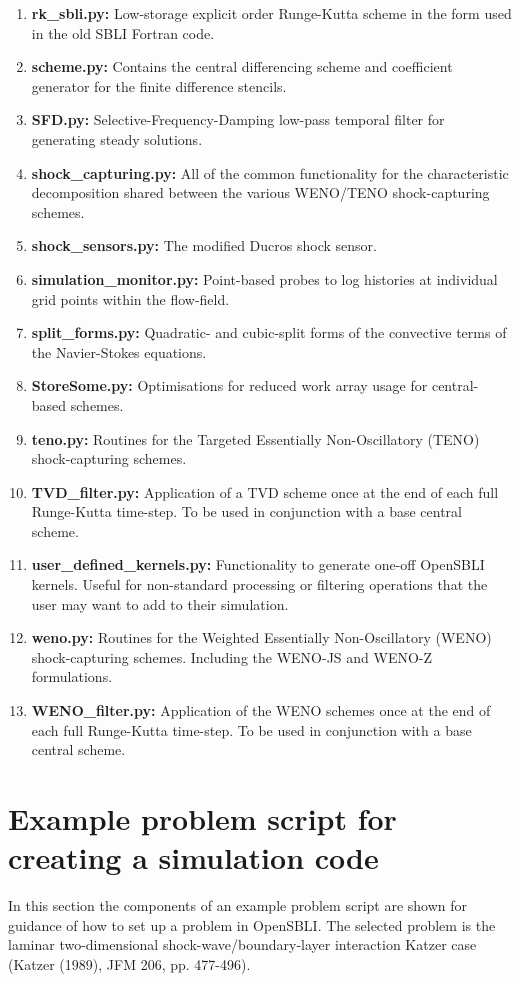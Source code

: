 \documentclass[11pt]{article}
\begin{document}
\begin{enumerate}
	\item{\textbf{rk\_sbli.py:} Low-storage explicit  order Runge-Kutta scheme in the form used in the old SBLI Fortran code.}	
	\item{\textbf{scheme.py:} Contains the central differencing scheme and coefficient generator for the finite difference stencils.}
  \item{\textbf{SFD.py:} Selective-Frequency-Damping low-pass temporal filter for generating steady solutions.}
	\item{\textbf{shock\_capturing.py:} All of the common functionality for the characteristic decomposition shared between the various WENO/TENO shock-capturing schemes.}
	\item{\textbf{shock\_sensors.py:} The modified Ducros shock sensor.}
  \item{\textbf{simulation\_monitor.py:} Point-based probes to log histories at individual grid points within the flow-field.}
  \item{\textbf{split\_forms.py:} Quadratic- and cubic-split forms of the convective terms of the Navier-Stokes equations.}
  \item{\textbf{StoreSome.py:} Optimisations for reduced work array usage for central-based schemes.}
	\item{\textbf{teno.py:} Routines for the Targeted Essentially Non-Oscillatory (TENO) shock-capturing schemes.}
    \item{\textbf{TVD\_filter.py:} Application of a TVD scheme once at the end of each full Runge-Kutta time-step. To be used in conjunction with a base central scheme.}
	\item{\textbf{user\_defined\_kernels.py:} Functionality to generate one-off OpenSBLI kernels. Useful for non-standard processing or filtering operations that the user may want to add to their simulation.}	
	\item{\textbf{weno.py:} Routines for the Weighted Essentially Non-Oscillatory (WENO) shock-capturing schemes. Including the WENO-JS and WENO-Z formulations.}
  \item{\textbf{WENO\_filter.py:} Application of the WENO schemes once at the end of each full Runge-Kutta time-step. To be used in conjunction with a base central scheme.}
\end{enumerate}

\newpage
\section{Example problem script for creating a simulation code}
In this section the components of an example problem script are shown for guidance of how to set up a problem in OpenSBLI. The selected problem is the laminar two-dimensional shock-wave/boundary-layer interaction Katzer case (Katzer (1989), JFM 206, pp. 477-496).
\end{document}
